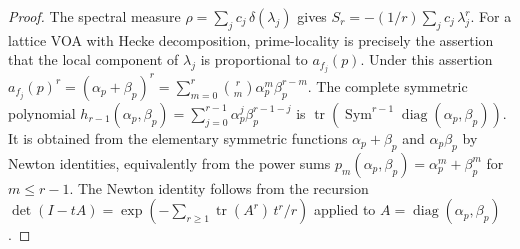 \begin{proof}
The spectral measure $\rho = \sum_j c_j\,\delta(\lambda_j)$ gives
$S_r = -(1/r)\sum_j c_j\,\lambda_j^r$. For a lattice VOA with
Hecke decomposition, prime-locality is precisely the assertion that
the local component of $\lambda_j$ is proportional to $a_{f_j}(p)$.
Under this assertion
$a_{f_j}(p)^r = (\alpha_p+\beta_p)^r
= \sum_{m=0}^r \binom{r}{m}\alpha_p^m\beta_p^{r-m}$.
The complete symmetric polynomial
$h_{r-1}(\alpha_p,\beta_p)=\sum_{j=0}^{r-1}
\alpha_p^j\beta_p^{r-1-j}$ is
$\operatorname{tr}(\operatorname{Sym}^{r-1}
\operatorname{diag}(\alpha_p,\beta_p))$. It is obtained from the
elementary symmetric functions $\alpha_p+\beta_p$ and
$\alpha_p\beta_p$ by Newton identities, equivalently from the power
sums $p_m(\alpha_p,\beta_p)=\alpha_p^m+\beta_p^m$ for
$m\le r-1$.
The Newton identity follows from the recursion
$\det(I - tA) = \exp(-\sum_{r\ge1} \operatorname{tr}(A^r)\,t^r/r)$
applied to $A = \operatorname{diag}(\alpha_p,\beta_p)$.
\end{proof}

